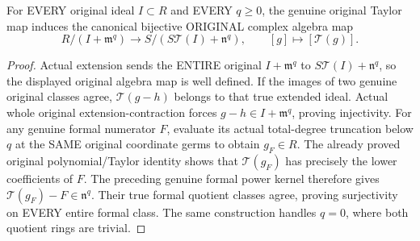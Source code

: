 \begin{theorem}
\label{hir:actual-original-formal-whole-jet-map-bijective}
For EVERY original ideal $I\subset R$ and EVERY $q\ge0$, the genuine
original Taylor map induces the canonical bijective ORIGINAL complex
algebra map
\[
 R/(I+\mathfrak m^q)\longrightarrow
 S/(S\mathcal T(I)+\mathfrak n^q),\qquad[g]\longmapsto[\mathcal T(g)].
\]
\leanok
\end{theorem}
\begin{proof}
Actual extension sends the ENTIRE original $I+\mathfrak m^q$ to
$S\mathcal T(I)+\mathfrak n^q$, so the displayed original algebra map
is well defined. If the images of two genuine original classes agree,
$\mathcal T(g-h)$ belongs to that true extended ideal. Actual whole
original extension-contraction forces $g-h\in I+\mathfrak m^q$,
proving injectivity.
For any genuine formal numerator $F$, evaluate its actual total-degree
truncation below $q$ at the SAME original coordinate germs to obtain
$g_F\in R$. The already proved original polynomial/Taylor identity
shows that $\mathcal T(g_F)$ has precisely the lower coefficients of
$F$. The preceding genuine formal power kernel therefore gives
$\mathcal T(g_F)-F\in\mathfrak n^q$. Their true formal quotient
classes agree, proving surjectivity on EVERY entire formal class. The
same construction handles $q=0$, where both quotient rings are trivial.
\end{proof}

